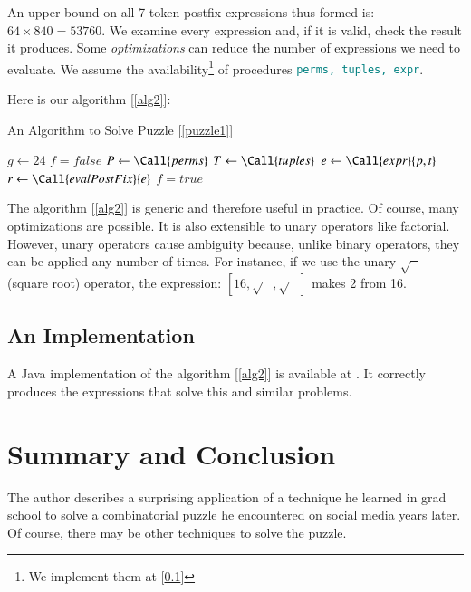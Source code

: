 \documentclass{resonance}
\begin{document}
An upper bound on all 7-token postfix expressions thus formed is: $64\times 840 = 53760$. We examine every expression and, if it is valid, check the result it produces. Some \emph{optimizations} can reduce the number of expressions we need to evaluate. We assume the availability\footnote{We implement them at [\ref{ss:impl}]} of procedures \texttt{\textcolor{teal}{perms, tuples, expr}}.  

Here is our algorithm [\ref{alg2}]:
\begin{algorithm}
\caption{An Algorithm to Solve Puzzle [\ref{puzzle1}]}
\label{alg2}
\begin{algorithmic}[2]
  \State $g \gets 24$ 
  \State $f = false$  
  \State $P \gets \Call{perms}$  
  \State $T \gets \Call{tuples}$  
      \State $e \gets \Call {expr}{p, t}$ 
      \State $r \gets \Call {evalPostFix}{e}$ 
	\State $f = true$
      \EndIf
    \EndFor
  \EndFor
        \State {}
  \EndIf
\end{algorithmic}
\end{algorithm}
The algorithm [\ref{alg2}] is generic and therefore useful in practice.  Of course, many optimizations are possible. It is also extensible to unary operators like factorial. However, unary operators cause ambiguity because, unlike binary operators, they can be applied any number of times. For instance, if we use the unary $\sqrt{\phantom{x}}$ (square root) operator, the expression: $[16, \sqrt{\phantom{x}}, \sqrt{\phantom{x}}]$ makes 2 from 16.
\subsection{An Implementation}
\label{ss:impl}
A Java implementation of the algorithm [\ref{alg2}] is available at \cite{Fazlur}. It correctly produces the expressions that solve this and similar problems.
\section{Summary and Conclusion}

The author describes a surprising application of a technique he learned in grad school to solve a combinatorial puzzle he encountered on social media years later. Of course, there may be other techniques to solve the puzzle. 
\end{document}
